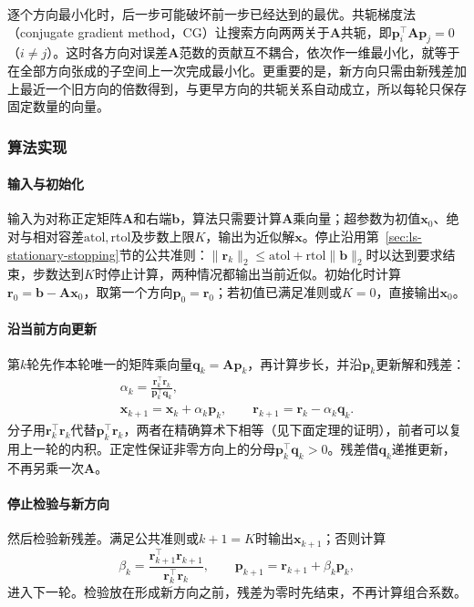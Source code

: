 逐个方向最小化时，后一步可能破坏前一步已经达到的最优。共轭梯度法（conjugate gradient method，CG）让搜索方向两两关于$\bm A$共轭，即$\bm p_i^\top\bm A\bm p_j=0$（$i\ne j$）。这时各方向对误差$\bm A$范数的贡献互不耦合，依次作一维最小化，就等于在全部方向张成的子空间上一次完成最小化。更重要的是，新方向只需由新残差加上最近一个旧方向的倍数得到，与更早方向的共轭关系自动成立，所以每轮只保存固定数量的向量。

\subsubsection{算法实现}

\paragraph{输入与初始化}
输入为对称正定矩阵$\bm A$和右端$\bm b$，算法只需要计算$\bm A$乘向量；超参数为初值$\bm x_0$、绝对与相对容差$\mathrm{atol},\mathrm{rtol}$及步数上限$K$，输出为近似解$\bm x$。停止沿用第~\ref{sec:ls-stationary-stopping}节的公共准则：$\lVert\bm r_k\rVert_2\le\mathrm{atol}+\mathrm{rtol}\lVert\bm b\rVert_2$时以达到要求结束，步数达到$K$时停止计算，两种情况都输出当前近似。初始化时计算$\bm r_0=\bm b-\bm A\bm x_0$，取第一个方向$\bm p_0=\bm r_0$；若初值已满足准则或$K=0$，直接输出$\bm x_0$。

\paragraph{沿当前方向更新}
第$k$轮先作本轮唯一的矩阵乘向量$\bm q_k=\bm A\bm p_k$，再计算步长，并沿$\bm p_k$更新解和残差：
\[
 \begin{gathered}
 \alpha_k=\frac{\bm r_k^\top\bm r_k}{\bm p_k^\top\bm q_k},\\
 \bm x_{k+1}=\bm x_k+\alpha_k\bm p_k,\qquad
 \bm r_{k+1}=\bm r_k-\alpha_k\bm q_k .
 \end{gathered}
\]
分子用$\bm r_k^\top\bm r_k$代替$\bm p_k^\top\bm r_k$，两者在精确算术下相等（见下面定理的证明），前者可以复用上一轮的内积。正定性保证非零方向上的分母$\bm p_k^\top\bm q_k>0$。残差借$\bm q_k$递推更新，不再另乘一次$\bm A$。

\paragraph{停止检验与新方向}
然后检验新残差。满足公共准则或$k+1=K$时输出$\bm x_{k+1}$；否则计算
\[
 \beta_k=\frac{\bm r_{k+1}^\top\bm r_{k+1}}{\bm r_k^\top\bm r_k},\qquad
 \bm p_{k+1}=\bm r_{k+1}+\beta_k\bm p_k,
\]
进入下一轮。检验放在形成新方向之前，残差为零时先结束，不再计算组合系数。

